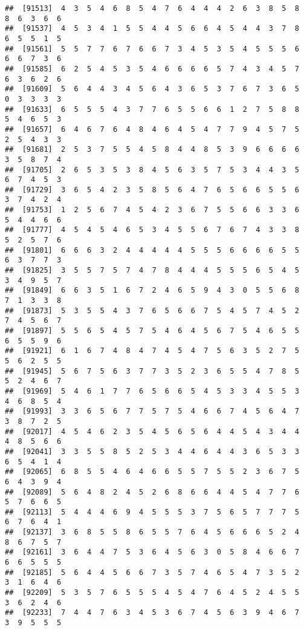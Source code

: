 \documentclass[
]{book}
\begin{document}
\begin{verbatim}
##  [91513]  4  3  5  4  6  8  5  4  7  6  4  4  4  2  6  3  8  5  8  8  6  3  6  6
##  [91537]  4  5  3  4  1  5  5  4  4  5  6  6  4  5  4  4  3  7  8  6  5  5  1  5
##  [91561]  5  5  7  7  6  7  6  6  7  3  4  5  3  5  4  5  5  5  6  6  6  7  3  6
##  [91585]  6  2  5  4  5  3  5  4  6  6  6  6  5  7  4  3  4  5  7  6  3  6  2  6
##  [91609]  5  6  4  4  3  4  5  6  4  3  6  5  3  7  6  7  3  6  5  0  3  3  3  3
##  [91633]  6  5  5  5  4  3  7  7  6  5  5  6  6  1  2  7  5  8  8  5  4  6  5  3
##  [91657]  6  4  6  7  6  4  8  4  6  4  5  4  7  7  9  4  5  7  5  2  5  4  3  3
##  [91681]  2  5  3  7  5  5  4  5  8  4  4  8  5  3  9  6  6  6  6  3  5  8  7  4
##  [91705]  2  6  5  3  5  3  8  4  5  6  3  5  7  5  3  4  4  3  5  6  7  4  5  3
##  [91729]  3  6  5  4  2  3  5  8  5  6  4  7  6  5  6  6  5  5  6  3  7  4  2  4
##  [91753]  1  2  5  6  7  4  5  4  2  3  6  7  5  5  6  6  3  3  6  5  4  4  6  6
##  [91777]  4  5  4  5  4  6  5  3  4  5  5  6  7  6  7  4  3  3  8  5  2  5  7  6
##  [91801]  6  6  6  3  2  4  4  4  4  4  5  5  5  6  6  6  6  5  5  6  3  7  7  3
##  [91825]  3  5  5  7  5  7  4  7  8  4  4  4  5  5  5  6  5  4  5  3  4  9  5  7
##  [91849]  6  6  3  5  1  6  7  2  4  6  5  9  4  3  0  5  5  6  8  7  1  3  3  8
##  [91873]  5  3  5  5  4  3  7  6  5  6  6  7  5  4  5  7  4  5  2  7  4  5  6  7
##  [91897]  5  5  6  5  4  5  7  5  4  6  4  5  6  7  5  4  6  5  5  6  5  5  9  6
##  [91921]  6  1  6  7  4  8  4  7  4  5  4  7  5  6  3  5  2  7  5  5  6  2  5  5
##  [91945]  5  6  7  5  6  3  7  7  3  5  2  3  6  5  5  4  7  8  5  5  2  4  6  7
##  [91969]  5  4  6  1  7  7  6  5  6  6  5  4  5  3  3  4  5  5  3  4  6  8  5  4
##  [91993]  3  3  6  5  6  7  7  5  7  5  4  6  6  7  4  5  6  4  7  3  8  7  2  5
##  [92017]  4  5  4  6  2  3  5  4  5  6  5  6  4  4  5  4  3  4  4  4  8  5  6  6
##  [92041]  3  3  5  5  8  5  2  5  3  4  4  6  4  4  3  6  5  3  3  6  5  4  1  4
##  [92065]  6  8  5  5  4  6  4  6  6  5  5  7  5  5  2  3  6  7  5  6  4  3  9  4
##  [92089]  5  6  4  8  2  4  5  2  6  8  6  6  4  4  5  4  7  7  6  5  7  6  6  5
##  [92113]  5  4  4  4  6  9  4  5  5  5  3  7  5  6  5  7  7  7  5  6  7  6  4  1
##  [92137]  3  6  8  5  5  8  6  5  5  7  6  4  5  6  6  6  5  2  4  8  6  7  5  7
##  [92161]  3  6  4  4  7  5  3  6  4  5  6  3  0  5  8  4  6  6  7  6  6  5  5  5
##  [92185]  5  6  4  4  5  6  6  7  3  5  7  4  6  5  4  7  3  5  2  3  1  6  4  6
##  [92209]  5  3  5  7  6  5  5  5  4  5  4  7  6  4  5  2  4  5  5  3  6  2  4  6
##  [92233]  7  4  4  7  6  3  4  5  3  6  7  4  5  6  3  9  4  6  7  3  9  5  5  5

\end{verbatim}
\end{document}

